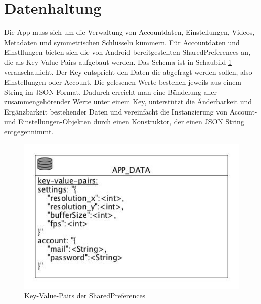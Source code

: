 \section{Datenhaltung}
Die App muss sich um die Verwaltung von Accountdaten, Einstellungen, Videos, Metadaten und symmetrischen Schlüsseln kümmern. Für Accountdaten und  Einstllungen bieten sich die von Android bereitgestellten SharedPreferences an, die als Key-Value-Pairs aufgebaut werden. Das Schema ist in Schaubild \ref{fig:sharedpreferences_overview} veranschaulicht. Der Key entspricht den Daten die abgefragt werden sollen, also Einstellungen oder Account. Die gelesenen Werte bestehen jeweils aus einem String im JSON Format. Dadurch erreicht man eine Bündelung aller zusammengehörender Werte unter einem Key, unterstützt die Änderbarkeit und Ergänzbarkeit bestehender Daten und vereinfacht die Instanzierung von Account- und Einstellungen-Objekten durch einen Konstruktor, der einen JSON String entgegennimmt.\newline\par


\begin{figure}[ht]
	\centering
\includegraphics[width=1\textwidth]{./resources/Diagramme/App/sharedpreferences_overview.jpg}
\caption{Key-Value-Pairs der SharedPreferences}
	\label{fig:sharedpreferences_overview}
\end{figure}

